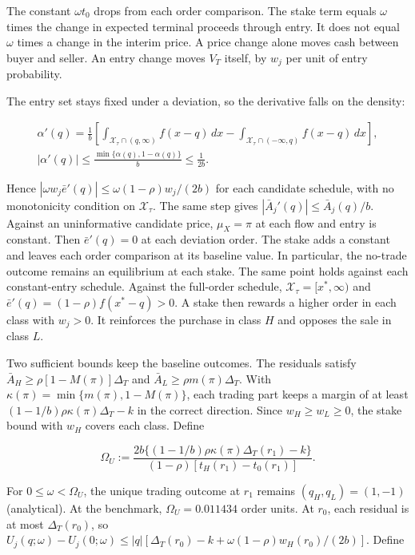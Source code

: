 \documentclass[
  11pt,
]{article}
\begin{document}
The constant \(\omega t_0\) drops from each order comparison. The
stake term equals \(\omega\) times the change in expected terminal
proceeds through entry. It does not equal \(\omega\) times a change
in the interim price. A price change alone moves cash between buyer
and seller. An entry change moves \(V_T\) itself, by \(w_j\) per
unit of entry probability.

The entry set stays fixed under a deviation, so the derivative
falls on the density:

\[
\begin{gathered}
\alpha'(q)=\frac1b\left[\int_{\mathcal X_\tau\cap(q,\infty)}f(x-q)\,dx
-\int_{\mathcal X_\tau\cap(-\infty,q)}f(x-q)\,dx\right],\\
|\alpha'(q)|\le\frac{\min\{\alpha(q),1-\alpha(q)\}}b\le\frac1{2b}.
\end{gathered}
\tag{OA.62}\label{eq:oa-oa-62}
\]

Hence \(|\omega w_j\bar e'(q)|\le\omega(1-\rho)w_j/(2b)\) for each
candidate schedule, with no monotonicity condition on \(\mathcal X_\tau\). The
same step gives \(|\bar A_j'(q)|\le \bar A_j(q)/b\). Against an uninformative
candidate price, \(\mu_X=\pi\) at each flow and entry is constant.
Then \(\bar e'(q)=0\) at each deviation order. The stake adds a
constant and leaves each order comparison at its baseline value.
In particular, the no-trade outcome remains an equilibrium at each
stake. The same point holds against each constant-entry schedule.
Against the full-order schedule, \(\mathcal X_\tau=[x^*,\infty)\) and
\(\bar e'(q)=(1-\rho)f(x^*-q)>0\). A stake then rewards a higher
order in each class with \(w_j>0\). It reinforces the purchase in
class \(H\) and opposes the sale in class \(L\).

Two sufficient bounds keep the baseline outcomes. The residuals
satisfy \(\bar A_H\ge\rho[1-M(\pi)]\Delta_T\) and
\(\bar A_L\ge\rho m(\pi)\Delta_T\). With
\(\kappa(\pi)=\min\{m(\pi),1-M(\pi)\}\), each trading part keeps a
margin of at least \((1-1/b)\rho\kappa(\pi)\Delta_T-k\) in the
correct direction. Since \(w_H\ge w_L\ge0\), the stake bound with \(w_H\)
covers each class. Define

\[
\Omega_U:=
\frac{2b\{(1-1/b)\rho\kappa(\pi)\Delta_T(r_1)-k\}}
{(1-\rho)[t_H(r_1)-t_0(r_1)]}.
\tag{OA.63}\label{eq:oa-oa-63}
\]

For \(0\le\omega<\Omega_U\), the unique trading outcome at \(r_1\)
remains \((q_H,q_L)=(1,-1)\) (analytical). At the benchmark,
\(\Omega_U=0.011434\) order units. At \(r_0\), each residual is
at most \(\Delta_T(r_0)\), so
\(U_j(q;\omega)-U_j(0;\omega)\le
|q|[\Delta_T(r_0)-k+\omega(1-\rho)w_H(r_0)/(2b)]\). Define
\end{document}
